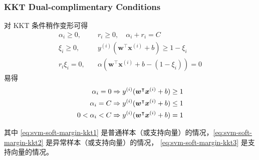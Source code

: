 	\subsubsection{KKT Dual-complimentary Conditions}
		对 KKT 条件稍作变形可得
		\begin{align*}
			\alpha_i \geq 0, \quad & r_i \geq 0, \quad \alpha_i + r_i = C \\
			\xi_i \geq 0, \quad & y^{(i)} ( \bm{w}^\intercal \bm{x}^{(i)} + b ) \geq 1 - \xi_i \\
			r_i \xi_i = 0, \quad & \alpha \left( \bm{w}^\intercal \bm{x}^{(i)} + b - (1-\xi_i) \right) = 0
		\end{align*}
		易得
		\begin{align}
			\alpha_i = 0 & \Rightarrow y^{(i)} ( \bm{w}^\intercal \bm{x}^{(i)} + b ) \geq 1 \label{eq:svm-soft-margin-kkt1} \\ 
			\alpha_i = C & \Rightarrow y^{(i)} ( \bm{w}^\intercal \bm{x}^{(i)} + b ) \leq 1 \label{eq:svm-soft-margin-kkt2} \\
			0 < \alpha_i < C & \Rightarrow y^{(i)} ( \bm{w}^\intercal \bm{x}^{(i)} + b ) = 1\label{eq:svm-soft-margin-kkt3}		
		\end{align}
		
		其中 \eqref{eq:svm-soft-margin-kkt1} 是普通样本（或支持向量）的情况，\eqref{eq:svm-soft-margin-kkt2} 是异常样本（或支持向量）的情况，
		\eqref{eq:svm-soft-margin-kkt3} 是支持向量的情况。